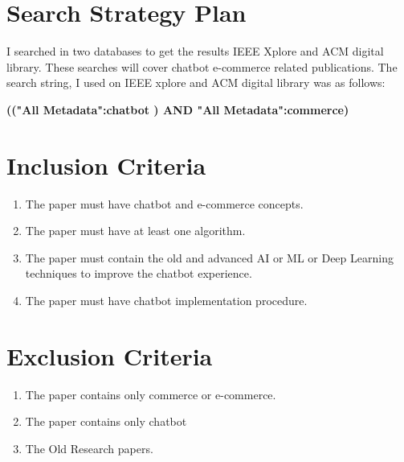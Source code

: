 \documentclass{article}
\begin{document}
\section*{Search Strategy Plan} 

I searched in two databases to get the results IEEE Xplore and ACM digital library. These searches will cover chatbot e-commerce related publications.\break
The search string, I used on IEEE xplore and ACM digital library was as follows:
\begin{center}
\textbf{(("All Metadata":chatbot ) AND "All Metadata":commerce)} 
\end{center}

\section*{Inclusion Criteria} 

\begin{enumerate}
  \item The paper must have chatbot and e-commerce concepts.\citep{1}
  \item The paper must have at least one algorithm.\citep{1}
  \item The paper must contain the old and advanced AI or ML or Deep Learning techniques to improve the chatbot experience.\citep{1} \citep{4}
  \item The paper must have chatbot implementation procedure.\citep{2}\citep{3}
\end{enumerate}

\section*{Exclusion Criteria} 

\begin{enumerate}
  \item The paper contains only commerce or e-commerce.\citep{7}
  \item The paper contains only chatbot \citep{5}
  \item The Old Research papers.\citep{6}
\end{enumerate}
\clearpage


\end{document}
